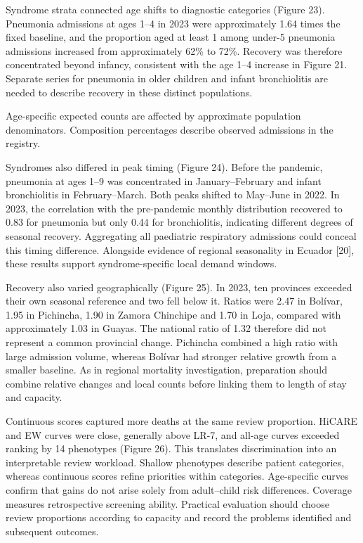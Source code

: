 \documentclass[11pt,a4paper]{article}
\newcommand{\subheading}[1]{\par\needspace{3\baselineskip}\vspace{5pt}{\bfseries #1}\par\vspace{1pt}}
\begin{document}
\subheading{Figure 23. Syndrome-specific rebound and age shifts among admissions in children under 5.}
Syndrome strata connected age shifts to diagnostic categories (Figure 23). Pneumonia admissions at ages 1–4 in 2023 were approximately 1.64 times the fixed baseline, and the proportion aged at least 1 among under-5 pneumonia admissions increased from approximately 62\% to 72\%. Recovery was therefore concentrated beyond infancy, consistent with the age 1–4 increase in Figure 21. Separate series for pneumonia in older children and infant bronchiolitis are needed to describe recovery in these distinct populations.

{\small Age-specific expected counts are affected by approximate population denominators. Composition percentages describe observed admissions in the registry.\par}
\subheading{Figure 24. Monthly distributions of paediatric admissions before the pandemic and in 2022 and 2023.}
Syndromes also differed in peak timing (Figure 24). Before the pandemic, pneumonia at ages 1–9 was concentrated in January–February and infant bronchiolitis in February–March. Both peaks shifted to May–June in 2022. In 2023, the correlation with the pre-pandemic monthly distribution recovered to 0.83 for pneumonia but only 0.44 for bronchiolitis, indicating different degrees of seasonal recovery. Aggregating all paediatric respiratory admissions could conceal this timing difference. Alongside evidence of regional seasonality in Ecuador [20], these results support syndrome-specific local demand windows.

\subheading{Figure 25. Paediatric non-COVID ARI admissions in 2023 relative to provincial pre-pandemic seasonal incidence.}
Recovery also varied geographically (Figure 25). In 2023, ten provinces exceeded their own seasonal reference and two fell below it. Ratios were 2.47 in Bolívar, 1.95 in Pichincha, 1.90 in Zamora Chinchipe and 1.70 in Loja, compared with approximately 1.03 in Guayas. The national ratio of 1.32 therefore did not represent a common provincial change. Pichincha combined a high ratio with large admission volume, whereas Bolívar had stronger relative growth from a smaller baseline. As in regional mortality investigation, preparation should combine relative changes and local counts before linking them to length of stay and capacity.

\subheading{Figure 26. Mortality coverage against admission-review proportion when records are ranked by predicted risk.}
Continuous scores captured more deaths at the same review proportion. HiCARE and EW curves were close, generally above LR-7, and all-age curves exceeded ranking by 14 phenotypes (Figure 26). This translates discrimination into an interpretable review workload. Shallow phenotypes describe patient categories, whereas continuous scores refine priorities within categories. Age-specific curves confirm that gains do not arise solely from adult–child risk differences. Coverage measures retrospective screening ability. Practical evaluation should choose review proportions according to capacity and record the problems identified and subsequent outcomes.
\end{document}
